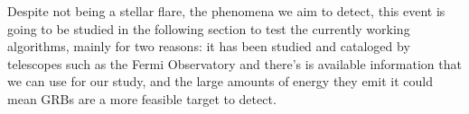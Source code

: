 Despite not being a stellar flare, the phenomena we aim to detect, this event is going to be studied in the following section to test the currently working algorithms, mainly for two reasons: it has been studied and cataloged by telescopes such as the Fermi Observatory and there’s is available information that we can use for our study, and the large amounts of energy they emit it could mean GRBs are a more feasible target to detect.